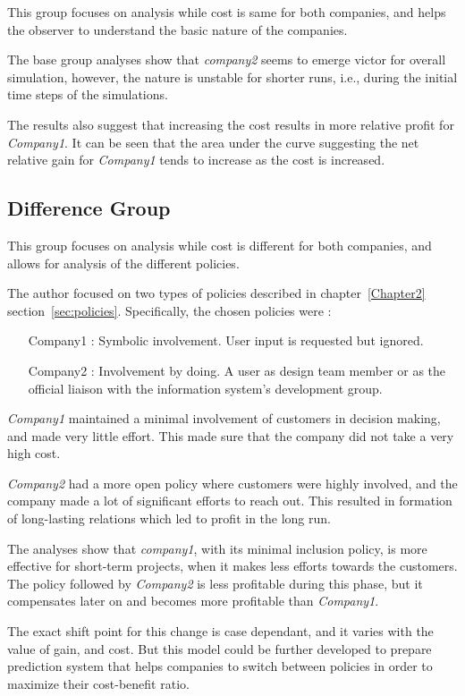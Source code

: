 This group focuses on analysis while cost is same for both companies, and helps the observer to understand the basic nature of the companies. 

The base group analyses show that \textit{company2} seems to emerge victor for overall simulation, however, the nature is unstable for shorter runs, i.e., during the initial time steps of the simulations.

The results also suggest that increasing the cost results in more relative profit for \textit{Company1}. It can be seen that the area under the curve suggesting the net relative gain for \textit{Company1} tends to increase as the cost is increased. 



\subsection{Difference Group}

This group focuses on analysis while cost is different for both companies, and allows for analysis of the different policies.

The author focused on two types of policies described in chapter~\ref{Chapter2} section~\ref{sec:policies}. Specifically, the chosen policies were :

\begin{enumerate}
\item[Company1 :] Symbolic involvement. User input is requested but ignored.
\item[Company2 :] Involvement by doing. A user as design team member or as the official liaison with the information system's development group.
\end{enumerate}


\textit{Company1} maintained a minimal involvement of customers in decision making, and made very little effort. This made sure that the company did not take a very high cost. 

\textit{Company2} had a more open policy where customers were highly involved, and the company made a lot of significant efforts to reach out. This resulted in formation of long-lasting relations which led to profit in the long run.

The analyses show that \textit{company1}, with its minimal inclusion policy, is more effective for short-term projects, when it makes less efforts towards the customers. The policy followed by \textit{Company2} is less profitable during this phase, but it compensates later on and becomes more profitable than \textit{Company1}.

The exact shift point for this change is case dependant, and it varies with the value of gain, and cost. But this model could be further developed to prepare prediction system that helps companies to switch between policies in order to maximize their cost-benefit ratio.
